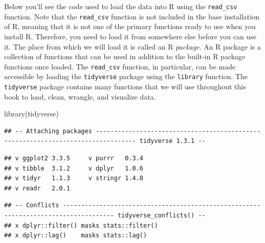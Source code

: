 \documentclass[
]{book}
\newenvironment{Shaded}{\begin{snugshade}}{\end{snugshade}}
\newcommand{\FunctionTok}[1]{\textcolor[rgb]{0,0,0}{#1}}
\newcommand{\NormalTok}[1]{#1}
\begin{document}
Below you'll see the code used to load the data into R using the \texttt{read\_csv}
function. Note that the \texttt{read\_csv} function is not included in the base
installation of R, meaning that it is not one of the primary functions ready to
use when you install R. Therefore, you need to load it from somewhere else
before you can use it. The place from which we will load it is called an R \emph{package}.
An R package  is a collection of functions that can be used in addition to the
built-in R package functions once loaded. The \texttt{read\_csv} function, in
particular, can be made accessible by loading the \texttt{tidyverse} package \citep{wickham2019tidverse}
using the \texttt{library} function.  The \texttt{tidyverse}  package contains many
functions that we will use throughout this book to load, clean, wrangle,
and visualize data.

\begin{Shaded}
\begin{Highlighting}[]
\FunctionTok{library}\NormalTok{(tidyverse)}
\end{Highlighting}
\end{Shaded}

\begin{verbatim}
## -- Attaching packages --------------------------------------------------------------------------------- tidyverse 1.3.1 --
\end{verbatim}

\begin{verbatim}
## v ggplot2 3.3.5     v purrr   0.3.4
## v tibble  3.1.2     v dplyr   1.0.6
## v tidyr   1.1.3     v stringr 1.4.0
## v readr   2.0.1
\end{verbatim}

\begin{verbatim}
## -- Conflicts ------------------------------------------------------------------------------------ tidyverse_conflicts() --
## x dplyr::filter() masks stats::filter()
## x dplyr::lag()    masks stats::lag()
\end{verbatim}
\end{document}
